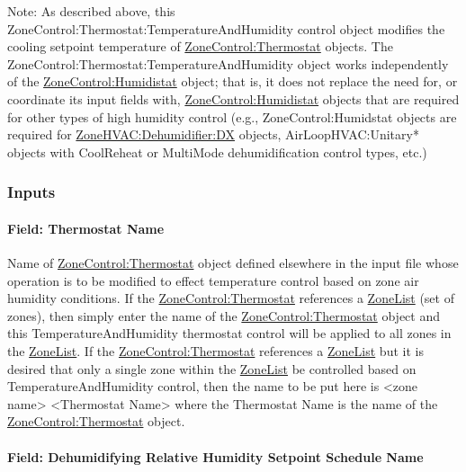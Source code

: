 Note: As described above, this ZoneControl:Thermostat:TemperatureAndHumidity control object modifies the cooling setpoint temperature of \hyperref[zonecontrolthermostat]{ZoneControl:Thermostat} objects. The ZoneControl:Thermostat:TemperatureAndHumidity object works independently of the \hyperref[zonecontrolhumidistat]{ZoneControl:Humidistat} object; that is, it does not replace the need for, or coordinate its input fields with, \hyperref[zonecontrolhumidistat]{ZoneControl:Humidistat} objects that are required for other types of high humidity control (e.g., ZoneControl:Humidstat objects are required for \hyperref[zonehvacdehumidifierdx]{ZoneHVAC:Dehumidifier:DX} objects, AirLoopHVAC:Unitary* objects with CoolReheat or MultiMode dehumidification control types, etc.)

\subsubsection{Inputs}\label{inputs-6-031}

\paragraph{Field: Thermostat Name}\label{field-thermostat-name-1}

Name of \hyperref[zonecontrolthermostat]{ZoneControl:Thermostat} object defined elsewhere in the input file whose operation is to be modified to effect temperature control based on zone air humidity conditions. If the \hyperref[zonecontrolthermostat]{ZoneControl:Thermostat} references a \hyperref[zonelist]{ZoneList} (set of zones), then simply enter the name of the \hyperref[zonecontrolthermostat]{ZoneControl:Thermostat} object and this TemperatureAndHumidity thermostat control will be applied to all zones in the \hyperref[zonelist]{ZoneList}. If the \hyperref[zonecontrolthermostat]{ZoneControl:Thermostat} references a \hyperref[zonelist]{ZoneList} but it is desired that only a single zone within the \hyperref[zonelist]{ZoneList} be controlled based on TemperatureAndHumidity control, then the name to be put here is \textless{}zone name\textgreater{} \textless{}Thermostat Name\textgreater{} where the Thermostat Name is the name of the \hyperref[zonecontrolthermostat]{ZoneControl:Thermostat} object.

\paragraph{Field: Dehumidifying Relative Humidity Setpoint Schedule Name}\label{field-dehumidifying-relative-humidity-setpoint-schedule-name}

